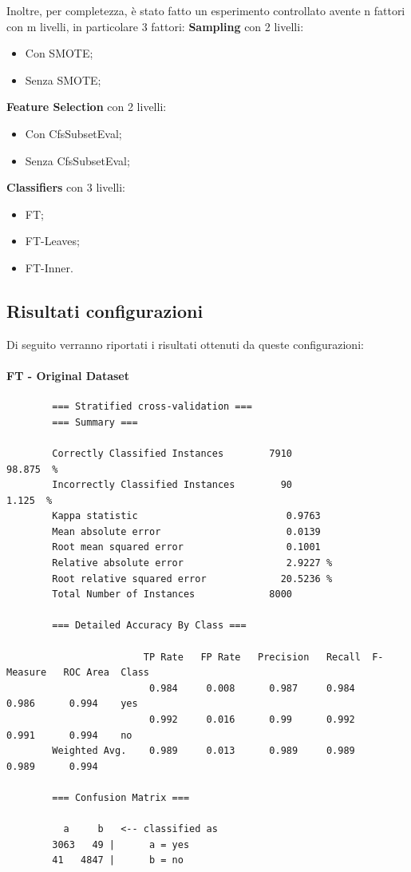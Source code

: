 Inoltre, per completezza, è stato fatto un esperimento controllato avente n fattori con m livelli, in particolare 3 fattori:
\textbf{Sampling} con 2 livelli:
\begin{itemize}
	\item Con SMOTE;
	\item Senza SMOTE;
\end{itemize}
\textbf{Feature Selection} con 2 livelli:
\begin{itemize}
	\item Con CfsSubsetEval;
	\item Senza CfsSubsetEval;
\end{itemize}
\textbf{Classifiers} con 3 livelli:
\begin{itemize}
	\item FT;
	\item FT-Leaves;
	\item FT-Inner.
\end{itemize}
\subsection{Risultati configurazioni}
Di seguito verranno riportati i risultati ottenuti da queste configurazioni: 
\paragraph{FT - Original Dataset}
{\footnotesize
	\begin{verbatim}
		=== Stratified cross-validation ===
		=== Summary ===
		
		Correctly Classified Instances        7910               98.875  %
		Incorrectly Classified Instances        90                1.125  %
		Kappa statistic                          0.9763
		Mean absolute error                      0.0139
		Root mean squared error                  0.1001
		Relative absolute error                  2.9227 %
		Root relative squared error             20.5236 %
		Total Number of Instances             8000     
		
		=== Detailed Accuracy By Class ===
		
		                TP Rate   FP Rate   Precision   Recall  F-Measure   ROC Area  Class
		                 0.984     0.008      0.987     0.984     0.986      0.994    yes
		                 0.992     0.016      0.99      0.992     0.991      0.994    no
		Weighted Avg.    0.989     0.013      0.989     0.989     0.989      0.994
		
		=== Confusion Matrix ===
		
		  a     b   <-- classified as
		3063   49 |      a = yes
		41   4847 |      b = no
	\end{verbatim}
}
